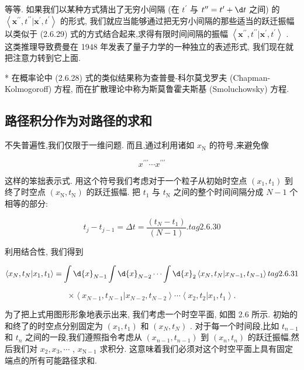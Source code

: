 \documentclass[lang=cn,newtx,10pt,scheme=chinese,thmcnt=section]{elegantbook}
\begin{document}
等等. 如果我们以某种方式猜出了无穷小间隔 (在 ${t}^{\prime }$ 与 ${t}^{\prime \prime } = {t}^{\prime } + {\d t}$ 之间) 的 $\left\langle {{\mathbf{x}}^{\prime \prime },{t}^{\prime \prime } | {\mathbf{x}}^{\prime },{t}^{\prime }}\right\rangle$ 的形式, 我们就应当能够通过把无穷小间隔的那些适当的跃迁振幅以类似于 (2.6.29) 式的方式结合起来,求得有限时间间隔的振幅 $\left\langle {{\mathbf{x}}^{\prime \prime },{t}^{\prime \prime } | {\mathbf{x}}^{\prime },{t}^{\prime }}\right\rangle$ . 这类推理导致费曼在 1948 年发表了量子力学的一种独立的表述形式, 我们现在就把注意力转到它上面.

* 在概率论中 (2.6.28) 式的类似结果称为查普曼-科尔莫戈罗夫 (Chapman-Kolmogoroff) 方程, 而在扩散理论中称为斯莫鲁霍夫斯基 (Smoluchowsky) 方程.

\subsection*{路径积分作为对路径的求和}
不失普遍性,我们仅限于一维问题. 而且,通过利用诸如 ${x}_{\mathrm{N}}$ 的符号,来避免像

$$
{x}^{\prime \prime \prime }\cdots {x}^{\prime \prime \prime }
$$

这样的笨拙表示式. 用这个符号我们考虑对于一个粒子从初始时空点 $\left( {{x}_{1},{t}_{1}}\right)$ 到终了时空点 $\left( {{x}_{\mathrm{N}},{t}_{\mathrm{N}}}\right)$ 的跃迁振幅. 把 ${t}_{1}$ 与 ${t}_{\mathrm{N}}$ 之间的整个时间间隔分成 $N - 1$ 个相等的部分:

$$
{t}_{j} - {t}_{j - 1} = {\Delta t} = \frac{\left( {t}_{N} - {t}_{1}\right) }{\left( N - 1\right) }. tag{2.6.30}
$$

利用结合性, 我们得到

$$
\left\langle {{x}_{N},{t}_{N} | {x}_{1},{t}_{1}}\right\rangle = \int \d{x}_{N - 1}\int \d{x}_{N - 2}\cdots \int \d{x}_{2}\left\langle {{x}_{N},{t}_{N} | {x}_{N - 1},{t}_{N - 1}}\right\rangle tag{2. 6.31}
$$

$$
\times \left\langle {{x}_{N - 1},{t}_{N - 1} | {x}_{N - 2},{t}_{N - 2}}\right\rangle \cdots \left\langle {{x}_{2},{t}_{2} | {x}_{1},{t}_{1}}\right\rangle .
$$

为了把上式用图形形象地表示出来, 我们考虑一个时空平面, 如图 2.6 所示. 初始的和终了的时空点分别固定为 $\left( {{x}_{1},{t}_{1}}\right)$ 和 $\left( {{x}_{N},{t}_{N}}\right)$ . 对于每一个时间段,比如 ${t}_{n - 1}$ 和 ${t}_{n}$ 之间的一段,我们遵照指令考虑从 $\left( {{x}_{n - 1},{t}_{n - 1}}\right)$ 到 $\left( {{x}_{n},{t}_{n}}\right)$ 的跃迁振幅,然后我们对 ${x}_{2},{x}_{3},\cdots$ , ${x}_{\mathrm{N} - 1}$ 求积分. 这意味着我们必须对这个时空平面上具有固定端点的所有可能路径求和.
\end{document}
